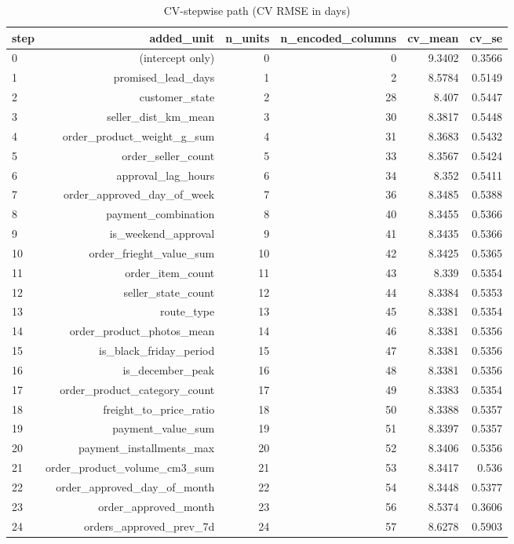 \begin{table}[htbp]
\centering
\small
\caption{CV-stepwise path (CV RMSE in days)}
\begin{tabular}{lrrrrr}
\toprule
step & added\_unit & n\_units & n\_encoded\_columns & cv\_mean & cv\_se \\
\midrule
0 & (intercept only) & 0 & 0 & 9.3402 & 0.3566 \\
1 & promised\_lead\_days & 1 & 2 & 8.5784 & 0.5149 \\
2 & customer\_state & 2 & 28 & 8.407 & 0.5447 \\
3 & seller\_dist\_km\_mean & 3 & 30 & 8.3817 & 0.5448 \\
4 & order\_product\_weight\_g\_sum & 4 & 31 & 8.3683 & 0.5432 \\
5 & order\_seller\_count & 5 & 33 & 8.3567 & 0.5424 \\
6 & approval\_lag\_hours & 6 & 34 & 8.352 & 0.5411 \\
7 & order\_approved\_day\_of\_week & 7 & 36 & 8.3485 & 0.5388 \\
8 & payment\_combination & 8 & 40 & 8.3455 & 0.5366 \\
9 & is\_weekend\_approval & 9 & 41 & 8.3435 & 0.5366 \\
10 & order\_frieght\_value\_sum & 10 & 42 & 8.3425 & 0.5365 \\
11 & order\_item\_count & 11 & 43 & 8.339 & 0.5354 \\
12 & seller\_state\_count & 12 & 44 & 8.3384 & 0.5353 \\
13 & route\_type & 13 & 45 & 8.3381 & 0.5354 \\
14 & order\_product\_photos\_mean & 14 & 46 & 8.3381 & 0.5356 \\
15 & is\_black\_friday\_period & 15 & 47 & 8.3381 & 0.5356 \\
16 & is\_december\_peak & 16 & 48 & 8.3381 & 0.5356 \\
17 & order\_product\_category\_count & 17 & 49 & 8.3383 & 0.5354 \\
18 & freight\_to\_price\_ratio & 18 & 50 & 8.3388 & 0.5357 \\
19 & payment\_value\_sum & 19 & 51 & 8.3397 & 0.5357 \\
20 & payment\_installments\_max & 20 & 52 & 8.3406 & 0.5356 \\
21 & order\_product\_volume\_cm3\_sum & 21 & 53 & 8.3417 & 0.536 \\
22 & order\_approved\_day\_of\_month & 22 & 54 & 8.3448 & 0.5377 \\
23 & order\_approved\_month & 23 & 56 & 8.5374 & 0.3606 \\
24 & orders\_approved\_prev\_7d & 24 & 57 & 8.6278 & 0.5903 \\
\bottomrule
\end{tabular}
\par\smallskip\begin{minipage}{\linewidth}\footnotesize \end{minipage}
\end{table}

